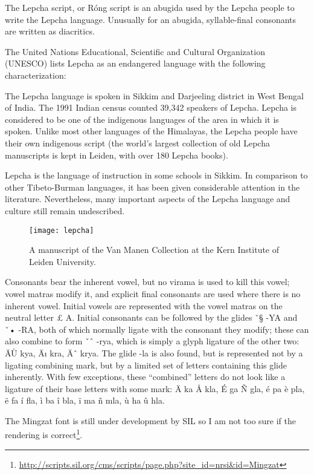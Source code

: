 The Lepcha script, or Róng script is an abugida used by the Lepcha people to write the Lepcha language. Unusually for an abugida, syllable-final consonants are written as diacritics.

The United Nations Educational, Scientific and Cultural Organization (UNESCO) lists Lepcha as an endangered language with the following characterization:

The Lepcha language is spoken in Sikkim and Darjeeling district in West Bengal of India. The 1991 Indian census counted 39,342 speakers of Lepcha. Lepcha is considered to be one of the indigenous languages of the area in which it is spoken. Unlike most other languages of the Himalayas, the Lepcha people have their own indigenous script (the world's largest collection of old Lepcha manuscripts is kept in Leiden, with over 180 Lepcha books).

Lepcha is the language of instruction in some schools in Sikkim. In comparison to other Tibeto-Burman languages, it has been given considerable attention in the literature. Nevertheless, many important aspects of the Lepcha language and culture still remain undescribed. 


\begin{figure}[htbp]
\centering
\texttt{[image: lepcha]}

\caption{A manuscript of the Van Manen Collection at the Kern Institute of Leiden University.}
\end{figure}

{\lepcha
Consonants bear the inherent vowel, but no virama is used to kill this vowel; vowel matras modify it, and
explicit final consonants are used where there is no inherent vowel. Initial vowels are represented with
the vowel matras on the neutral letter £ A. Initial consonants can be followed by the glides ˇ§ -YA and
ˇ• -RA, both of which normally ligate with the consonant they modify; these can also combine to form
ˇˆ -rya, which is simply a glyph ligature of the other two: ÄÙ kya, Äı kra, Äˆ krya. The glide -la is also
found, but is represented not by a ligating combining mark, but by a limited set of letters containing this
glide inherently. With few exceptions, these “combined” letters do not look like a ligature of their base
letters with some mark: Ä ka Å kla, É ga Ñ gla, é pa è pla, ë fa í fla, ì ba î bla, ï ma ñ mla,
ù ha û hla.}

The Mingzat font is still under development by SIL so I am not too sure if the rendering is correct\footnote{\url{http://scripts.sil.org/cms/scripts/page.php?site_id=nrsi&id=Mingzat}}.



